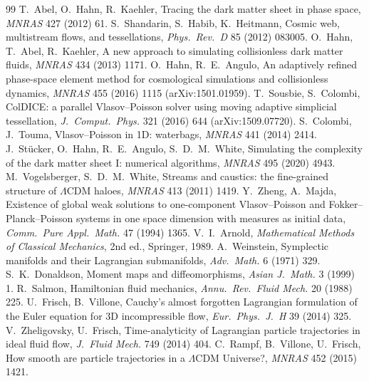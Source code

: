 \documentclass[11pt,a4paper]{article}
\numberwithin{equation}{section}
\theoremstyle{definition}
\theoremstyle{remark}
\begin{document}
\begin{thebibliography}{99}\small
{} T.~Abel, O.~Hahn, R.~Kaehler, Tracing the dark matter sheet in phase space, \emph{MNRAS} 427 (2012) 61.
 S.~Shandarin, S.~Habib, K.~Heitmann, Cosmic web, multistream flows, and tessellations, \emph{Phys.\ Rev.\ D} 85 (2012) 083005.
 O.~Hahn, T.~Abel, R.~Kaehler, A new approach to simulating collisionless dark matter fluids, \emph{MNRAS} 434 (2013) 1171.
 O.~Hahn, R.~E.~Angulo, An adaptively refined phase-space element method for cosmological simulations and collisionless dynamics, \emph{MNRAS} 455 (2016) 1115 (arXiv:1501.01959).
 T.~Sousbie, S.~Colombi, ColDICE: a parallel Vlasov--Poisson solver using moving adaptive simplicial tessellation, \emph{J.\ Comput.\ Phys.} 321 (2016) 644 (arXiv:1509.07720).
 S.~Colombi, J.~Touma, Vlasov--Poisson in 1D: waterbags, \emph{MNRAS} 441 (2014) 2414.
 J.~St\"ucker, O.~Hahn, R.~E.~Angulo, S.~D.~M.~White, Simulating the complexity of the dark matter sheet I: numerical algorithms, \emph{MNRAS} 495 (2020) 4943.
 M.~Vogelsberger, S.~D.~M.~White, Streams and caustics: the fine-grained structure of $\Lambda$CDM haloes, \emph{MNRAS} 413 (2011) 1419.
 Y.~Zheng, A.~Majda, Existence of global weak solutions to one-component Vlasov--Poisson and Fokker--Planck--Poisson systems in one space dimension with measures as initial data, \emph{Comm.\ Pure Appl.\ Math.} 47 (1994) 1365.
 V.~I.~Arnold, \emph{Mathematical Methods of Classical Mechanics}, 2nd ed., Springer, 1989.
 A.~Weinstein, Symplectic manifolds and their Lagrangian submanifolds, \emph{Adv.\ Math.} 6 (1971) 329.
 S.~K.~Donaldson, Moment maps and diffeomorphisms, \emph{Asian J.\ Math.} 3 (1999) 1.
 R.~Salmon, Hamiltonian fluid mechanics, \emph{Annu.\ Rev.\ Fluid Mech.} 20 (1988) 225.
 U.~Frisch, B.~Villone, Cauchy's almost forgotten Lagrangian formulation of the Euler equation for 3D incompressible flow, \emph{Eur.\ Phys.\ J.\ H} 39 (2014) 325.
 V.~Zheligovsky, U.~Frisch, Time-analyticity of Lagrangian particle trajectories in ideal fluid flow, \emph{J.\ Fluid Mech.} 749 (2014) 404.
 C.~Rampf, B.~Villone, U.~Frisch, How smooth are particle trajectories in a $\Lambda$CDM Universe?, \emph{MNRAS} 452 (2015) 1421.

\end{thebibliography}
\end{document}
